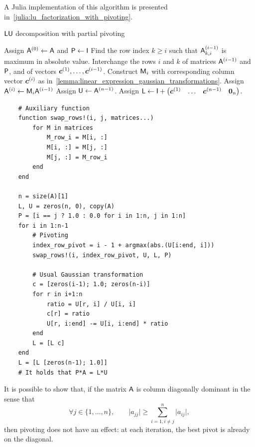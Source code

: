 A Julia implementation of this algorithm is presented in~\cref{julia:lu_factorization_with_pivoting}.
\begin{algorithm}
\caption{$\mat L \mat U$ decomposition with partial pivoting}%
\label{algo:LU_decomposition_with_partial_pivoting}%
\begin{algorithmic}
\State Assign $\mathsf A^{(0)} \gets \mathsf A$ and $\mathsf P \gets \mathsf I$
    \State Find the row index $k \geq i$ such that $\mathsf A^{(i-1)}_{k,i}$ is maximum in absolute value.
    \State Interchange the rows $i$ and $k$ of matrices $\mathsf A^{(i-1)}$ and $\mathsf P$, and of vectors $\mathbf{\boldsymbol{c}}^{(1)}, \dotsc, \mathbf{\boldsymbol{c}}^{(i-1)}$.
    \State Construct $\mathsf M_{i}$ with corresponding column vector $\mathbf{\boldsymbol{c}}^{(i)}$ as in~\cref{lemma:linear_expression_gaussian_transformations}.
    \State Assign $\mathsf A^{(i)} \gets \mathsf M_{i} \mathsf A^{(i-1)}$
\EndFor
\State Assign $\mathsf U \gets \mathsf A^{(n-1)}$.
\State Assign $\mathsf L \gets \mathsf I + \begin{pmatrix} \mathbf{\boldsymbol{c}}^{(1)} & \hdots & \mathbf{\boldsymbol{c}}^{(n-1)} & \mathbf{\boldsymbol{0}}_n \end{pmatrix}$.
\end{algorithmic}
\end{algorithm}

\begin{code}
\begin{verbatim}
    # Auxiliary function
    function swap_rows!(i, j, matrices...)
        for M in matrices
            M_row_i = M[i, :]
            M[i, :] = M[j, :]
            M[j, :] = M_row_i
        end
    end

    n = size(A)[1]
    L, U = zeros(n, 0), copy(A)
    P = [i == j ? 1.0 : 0.0 for i in 1:n, j in 1:n]
    for i in 1:n-1
        # Pivoting
        index_row_pivot = i - 1 + argmax(abs.(U[i:end, i]))
        swap_rows!(i, index_row_pivot, U, L, P)

        # Usual Gaussian transformation
        c = [zeros(i-1); 1.0; zeros(n-i)]
        for r in i+1:n
            ratio = U[r, i] / U[i, i]
            c[r] = ratio
            U[r, i:end] -= U[i, i:end] * ratio
        end
        L = [L c]
    end
    L = [L [zeros(n-1); 1.0]]
    # It holds that P*A = L*U
\end{verbatim}
\caption{%
    $\mat L \mat U$ factorization with partial pivoting.
}%
\label{julia:lu_factorization_with_pivoting}
\end{code}

\begin{remark}
    It is possible to show that,
    if the matrix $\mathsf A$ is column diagonally dominant in the sense that
    \[
        \forall j \in \{1, \dotsc, n\}, \qquad
        \lvert a_{jj} \rvert \geq \sum_{i=1, i\neq j}^{n} \lvert a_{ij} \rvert,
    \]
    then pivoting does not have an effect:
    at each iteration,
    the best pivot is already on the diagonal.
\end{remark}

